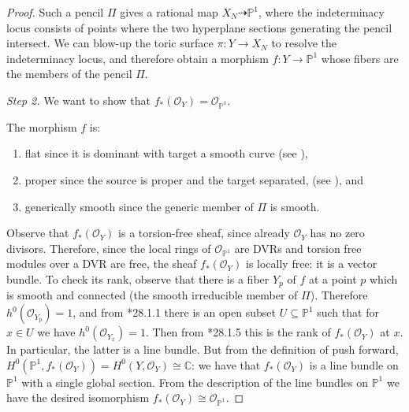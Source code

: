 \documentclass[11pt]{article} %
\theoremstyle{definition}
\newcommand{\green}[1]{{\color{calpolypomonagreen} #1}}
\begin{document}
\begin{proof}
Such a pencil $\Pi$ gives a rational map $X_N \dashrightarrow \mathbb{P}^1$, where the indeterminacy locus consists of points where the two hyperplane sections generating the pencil intersect. We can blow-up the toric surface $\pi:Y \to X_N$ to resolve the indeterminacy locus, and therefore obtain a morphism $f:Y\to \mathbb{P}^1$ whose fibers are the members of the pencil $\Pi$.

\textit{Step 2.} We want to show that $f_*(\mathcal{O}_Y)= \mathcal{O}_{\mathbb{P}^1}$.

The morphism $f$ is:
\begin{enumerate}
    \item flat since it is dominant with target a smooth curve (see \cite[Proposition III.9.7]{Hart}),
    \item proper since the source is proper and the target separated, (see \cite[Corollary II.4.8 (e)]{Hart}), and 
    \item  generically smooth since the generic member of $\Pi$ is smooth. 
\end{enumerate}  Observe that $f_*(\mathcal{O}_Y)$ is a torsion-free sheaf, since already $\mathcal{O}_Y$ has no zero divisors. Therefore, since the local rings of $\mathcal{O}_{\mathbb{P}^1}$ are DVRs and torsion free modules over a DVR are free, the sheaf $f_*(\mathcal{O}_Y)$ is locally free: it is a vector bundle. To check its rank, observe that there is a fiber $Y_p$ of $f$ at a point $p$ which is smooth and connected (the smooth irreducible member of $\Pi$). Therefore $h^0(\mathcal{O}_{Y_p})=1$, and from \cite{Vak17}*{28.1.1} there is an open subset $U\subseteq \mathbb{P}^1$ such that for $x \in U$ we have
$h^0(\mathcal{O}_{Y_x})=1$. Then from \cite{Vak17}*{28.1.5} this is the rank of $f_*(\mathcal{O}_Y)$ at $x$. In particular, the latter is a line bundle. But from the definition of push forward, $H^0(\mathbb{P}^1,f_*(\mathcal{O}_Y)) = H^0(Y,\mathcal{O}_Y)\cong \mathbb{C}$: we have that $f_*(\mathcal{O}_Y)$ is a line bundle on $\mathbb{P}^1$ with a single global section. From the description of the line bundles on $\mathbb{P}^1$ we have the desired isomorphism $f_*(\mathcal{O}_Y)\cong \mathcal{O}_{\mathbb{P}^1}$.

\end{proof}
\end{document}
